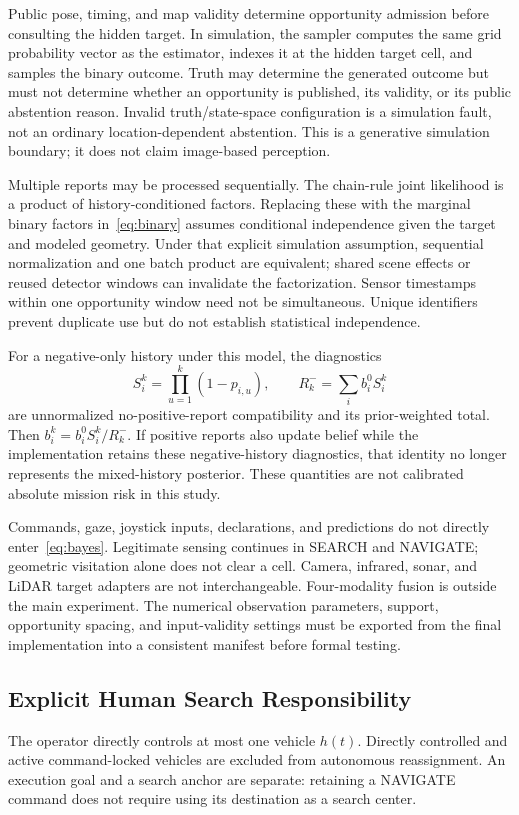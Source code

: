 \documentclass[conference]{IEEEtran}
\begin{document}
Public pose, timing, and map validity determine opportunity admission before consulting the hidden target. In simulation, the sampler computes the same grid probability vector as the estimator, indexes it at the hidden target cell, and samples the binary outcome. Truth may determine the generated outcome but must not determine whether an opportunity is published, its validity, or its public abstention reason. Invalid truth/state-space configuration is a simulation fault, not an ordinary location-dependent abstention. This is a generative simulation boundary; it does not claim image-based perception.

Multiple reports may be processed sequentially. The chain-rule joint likelihood is a product of history-conditioned factors. Replacing these with the marginal binary factors in~\eqref{eq:binary} assumes conditional independence given the target and modeled geometry. Under that explicit simulation assumption, sequential normalization and one batch product are equivalent; shared scene effects or reused detector windows can invalidate the factorization. Sensor timestamps within one opportunity window need not be simultaneous. Unique identifiers prevent duplicate use but do not establish statistical independence.

For a negative-only history under this model, the diagnostics
\begin{equation}
 S_i^k=\prod_{u=1}^k(1-p_{i,u}),\qquad R^-_k=\sum_i b_i^0S_i^k
\end{equation}
are unnormalized no-positive-report compatibility and its prior-weighted total. Then $b_i^k=b_i^0S_i^k/R^-_k$. If positive reports also update belief while the implementation retains these negative-history diagnostics, that identity no longer represents the mixed-history posterior. These quantities are not calibrated absolute mission risk in this study.

Commands, gaze, joystick inputs, declarations, and predictions do not directly enter~\eqref{eq:bayes}. Legitimate sensing continues in SEARCH and NAVIGATE; geometric visitation alone does not clear a cell. Camera, infrared, sonar, and LiDAR target adapters are not interchangeable. Four-modality fusion is outside the main experiment. The numerical observation parameters, support, opportunity spacing, and input-validity settings must be exported from the final implementation into a consistent manifest before formal testing.

\subsection{Explicit Human Search Responsibility}
The operator directly controls at most one vehicle $h(t)$. Directly controlled and active command-locked vehicles are excluded from autonomous reassignment. An execution goal and a search anchor are separate: retaining a NAVIGATE command does not require using its destination as a search center.
\end{document}
